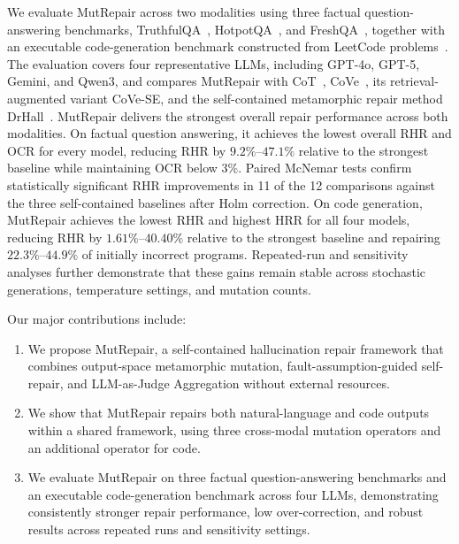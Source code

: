 \documentclass[acmsmall,screen,review,anonymous]{acmart}
\begin{document}
We evaluate MutRepair across two modalities using three factual question-answering benchmarks, TruthfulQA~\cite{lin2022truthfulqa}, HotpotQA~\cite{yang2018hotpotqa}, and FreshQA~\cite{vu2023freshllms}, together with an executable code-generation benchmark constructed from LeetCode problems~\cite{xia2025leetcodedataset}. The evaluation covers four representative LLMs, including GPT-4o, GPT-5, Gemini, and Qwen3, and compares MutRepair with CoT~\cite{wei2022chain}, CoVe~\cite{dhuliawala2024chain}, its retrieval-augmented variant CoVe-SE, and the self-contained metamorphic repair method DrHall~\cite{wu2025detecting}. MutRepair delivers the strongest overall repair performance across both modalities. On factual question answering, it achieves the lowest overall RHR and OCR for every model, reducing RHR by $9.2\%\text{--}47.1\%$ relative to the strongest baseline while maintaining OCR below $3\%$. Paired McNemar tests confirm statistically significant RHR improvements in 11 of the 12 comparisons against the three self-contained baselines after Holm correction. On code generation, MutRepair achieves the lowest RHR and highest HRR for all four models, reducing RHR by $1.61\%\text{--}40.40\%$ relative to the strongest baseline and repairing $22.3\%\text{--}44.9\%$ of initially incorrect programs. Repeated-run and sensitivity analyses further demonstrate that these gains remain stable across stochastic generations, temperature settings, and mutation counts.

Our major contributions include:

\begin{enumerate}[leftmargin=20pt]
\item We propose MutRepair, a self-contained hallucination repair framework that combines output-space metamorphic mutation, fault-assumption-guided self-repair, and LLM-as-Judge Aggregation without external resources.

\item We show that MutRepair repairs both natural-language and code outputs within a shared framework, using three cross-modal mutation operators and an additional operator for code.

\item We evaluate MutRepair on three factual question-answering benchmarks and an executable code-generation benchmark across four LLMs, demonstrating consistently stronger repair performance, low over-correction, and robust results across repeated runs and sensitivity settings.
\end{enumerate}
\end{document}
